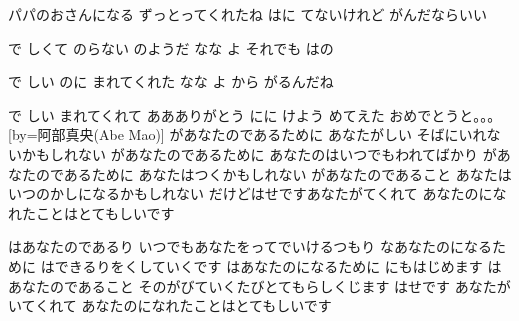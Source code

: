 \documentclass{article}
\newenvironment{Japanese}{%
\CJKfamily{min}%
\CJKtilde
\CJKnospace}{}
\begin{document}
\begin{CJK}{UTF8}{}
\begin{Japanese}
\begin{songs}{}
パパのおさんになる
ずっとってくれたね
はに
てないけれど
がんだならいい

で
しくて
のらない
のようだ
なな
よ
それでも
はの

で
しい
のに
まれてくれた
なな
よ
から
がるんだね

で
しい
まれてくれて
ああありがとう
にに
けよう
めてえた
おめでとうと。。。
\endverse
\endsong
[by=阿部真央(Abe Mao)]
\beginverse
{}があなたのであるために
あなたがしい
そばにいれないかもしれない
があなたのであるために
あなたのはいつでもわれてばかり
があなたのであるために
あなたはつくかもしれない
があなたのであること
あなたはいつのかしになるかもしれない
だけどはせですあなたがてくれて
あなたのになれたことはとてもしいです

はあなたのであるり
いつでもあなたをってでいけるつもり
なあなたのになるために
はできるりをくしていくです
はあなたのになるために
にもはじめます
はあなたのであること
そのがびていくたびとてもらしくじます
はせです
あなたがいてくれて
あなたのになれたことはとてもしいです


\end{songs}
\end{Japanese}
\end{CJK}
\end{document}
